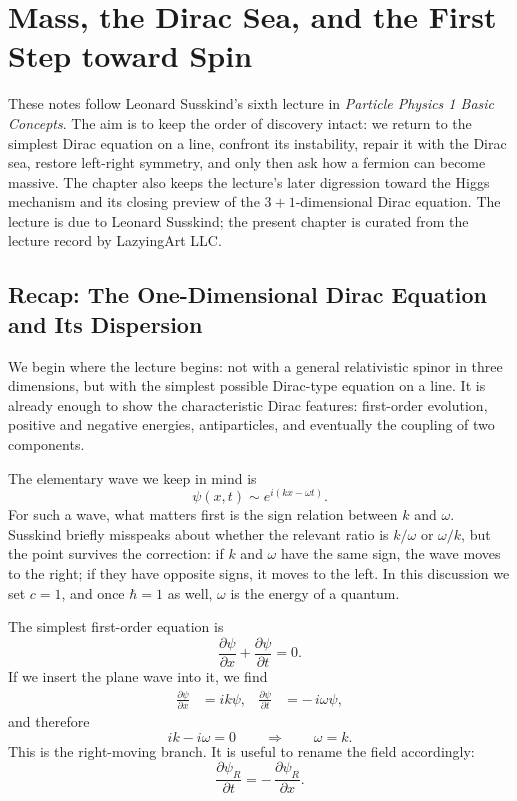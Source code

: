 \chapter{Mass, the Dirac Sea, and the First Step toward Spin}

These notes follow Leonard Susskind's sixth lecture in \emph{Particle Physics 1 Basic Concepts}. The aim is to keep the order of discovery intact: we return to the simplest Dirac equation on a line, confront its instability, repair it with the Dirac sea, restore left-right symmetry, and only then ask how a fermion can become massive. The chapter also keeps the lecture's later digression toward the Higgs mechanism and its closing preview of the \(3+1\)-dimensional Dirac equation. The lecture is due to Leonard Susskind; the present chapter is curated from the lecture record by LazyingArt LLC.

\section{Recap: The One-Dimensional Dirac Equation and Its Dispersion}

We begin where the lecture begins: not with a general relativistic spinor in three dimensions, but with the simplest possible Dirac-type equation on a line. It is already enough to show the characteristic Dirac features: first-order evolution, positive and negative energies, antiparticles, and eventually the coupling of two components.

The elementary wave we keep in mind is
\begin{equation}
\psi(x,t)\sim e^{i(kx-\omega t)}.
\end{equation}
For such a wave, what matters first is the sign relation between \(k\) and \(\omega\). Susskind briefly misspeaks about whether the relevant ratio is \(k/\omega\) or \(\omega/k\), but the point survives the correction: if \(k\) and \(\omega\) have the same sign, the wave moves to the right; if they have opposite signs, it moves to the left. In this discussion we set \(c=1\), and once \(\hbar=1\) as well, \(\omega\) is the energy of a quantum.

The simplest first-order equation is
\begin{equation}
\frac{\partial \psi}{\partial x}+\frac{\partial \psi}{\partial t}=0.
\end{equation}
If we insert the plane wave into it, we find
\begin{align}
\frac{\partial \psi}{\partial x}&=ik\psi, &
\frac{\partial \psi}{\partial t}&=-\,i\omega\psi,
\end{align}
and therefore
\begin{equation}
ik-i\omega=0
\qquad \Longrightarrow \qquad
\omega=k.
\end{equation}
This is the right-moving branch. It is useful to rename the field accordingly:
\begin{equation}
\frac{\partial \psi_R}{\partial t}=-\,\frac{\partial \psi_R}{\partial x}.
\end{equation}

